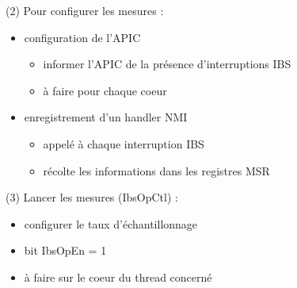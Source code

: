      \begin{frame}{\secname}{\subsecname (2)}        
	Pour configurer les mesures :
	\begin{itemize}
          \item configuration de l'APIC
          \begin{itemize}
            \item informer l'APIC de la présence d'interruptions IBS
            \item à faire pour chaque coeur
          \end{itemize}
          \item enregistrement d'un handler NMI
          \begin{itemize}
            \item appelé à chaque interruption IBS
            \item récolte les informations dans les registres MSR
          \end{itemize}
        \end{itemize}
      \end{frame}
      \begin{frame}{\secname}{\subsecname(3)}
        Lancer les mesures (IbsOpCtl) : 
	\begin{itemize}
	  \item configurer le taux d'échantillonnage
	  \item bit IbsOpEn = 1
	  \item à faire sur le coeur du thread concerné
	\end{itemize}
      \end{frame}
